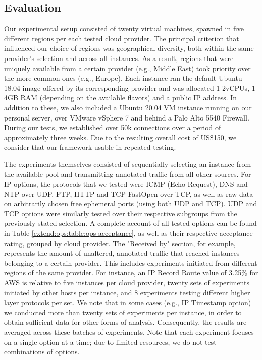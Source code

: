 \subsection{Evaluation}
\label{extend:ops:evaluation}

Our experimental setup consisted of twenty virtual machines, spawned in five different regions per each tested cloud provider. The principal criterion that influenced our choice of regions was geographical diversity, both within the same provider's selection and across all instances. As a result, regions that were uniquely available from a certain provider (e.g., Middle East) took priority over the more common ones (e.g., Europe). Each instance ran the default Ubuntu 18.04 image offered by its corresponding provider and was allocated 1-2vCPUs, 1-4GB RAM (depending on the available flavors) and a public IP address. In addition to these, we also included a Ubuntu 20.04 VM instance running on our personal server, over VMware vSphere 7 and behind a Palo Alto 5540 Firewall. During our tests, we established over 50k connections over a period of approximately three weeks. Due to the resulting overall cost of US\$150, we consider that our framework usable in repeated testing.

The experiments themselves consisted of sequentially selecting an instance from the available pool and transmitting annotated traffic from all other sources. For IP options, the protocols that we tested were ICMP (Echo Request), DNS and NTP over UDP, FTP, HTTP and TCP-FastOpen over TCP, as well as raw data on arbitrarily chosen free ephemeral ports (using both UDP and TCP). UDP and TCP options were similarly tested over their respective subgroups from the previously stated selection. A complete account of all tested options can be found in Table \ref{extend:ops:table:ops-acceptance}, as well as their respective acceptance rating, grouped by cloud provider. The "Received by" section, for example, represents the amount of unaltered, annotated traffic that reached instances belonging to a certain provider. This includes experiments initiated from different regions of the same provider. For instance, an IP Record Route value of 3.25\% for AWS is relative to five instances per cloud provider, twenty sets of experiments initiated by other hosts per instance, and 8 experiments testing different higher layer protocols per set. We note that in some cases (e.g., IP Timestamp option) we conducted more than twenty sets of experiments per instance, in order to obtain sufficient data for other forms of analysis. Consequently, the results are averaged across these batches of experiments. Note that each experiment focuses on a single option at a time; due to limited resources, we do not test combinations of options.

